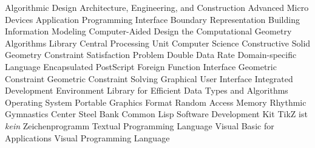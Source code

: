 \begin{acronym}[SO-DIMM]
       {Algorithmic Design}
      {Architecture, Engineering, and Construction}
      {Advanced Micro Devices}
      {Application Programming Interface}
    {Boundary Representation}
      {Building Information Modeling}
      {Computer-Aided Design}
     {the Computational Geometry Algorithms Library}
      {Central Processing Unit}
       {Computer Science}
      {Constructive Solid Geometry}
      {Constraint Satisfaction Problem}
      {Double Data Rate}
      {Domain-specific Language}
      {Encapsulated PostScript}
      {Foreign Function Interface}
       {Geometric Constraint}
      {Geometric Constraint Solving}
      {Graphical User Interface}
      {Integrated Development Environment}
     {Library for Efficient Data Types and Algorithms}
       {Operating System}
      {Portable Graphics Format}
      {Random Access Memory}
      {Rhythmic Gymnastics Center}
     {Steel Bank Common Lisp}
      {Software Development Kit}
     {TikZ ist \textit{kein} Zeichenprogramm}
      {Textual Programming Language}
      {Visual Basic for Applications}
      {Visual Programming Language}
\end{acronym}
